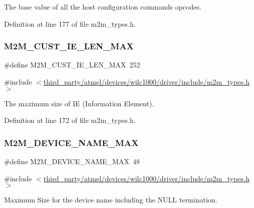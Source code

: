 The base value of all the host configuration commands opcodes. 

Definition at line 177 of file m2m\+\_\+types.\+h.

\mbox{\label{group__WlanDefines_gac03bb9e626f8472cad4f60ad3a0f9b84}} 
\subsubsection{\texorpdfstring{M2\+M\+\_\+\+C\+U\+S\+T\+\_\+\+I\+E\+\_\+\+L\+E\+N\+\_\+\+M\+AX}{M2M\_CUST\_IE\_LEN\_MAX}}
{\footnotesize\ttfamily \#define M2\+M\+\_\+\+C\+U\+S\+T\+\_\+\+I\+E\+\_\+\+L\+E\+N\+\_\+\+M\+AX~252}



{\ttfamily \#include $<$\hyperlink{m2m__types_8h}{third\+\_\+party/atmel/devices/wilc1000/driver/include/m2m\+\_\+types.\+h}$>$}

The maximum size of IE (Information Element). 

Definition at line 172 of file m2m\+\_\+types.\+h.

\mbox{\label{group__WlanDefines_ga13694b7fb6c7afefab58c38a43aa1957}} 
\subsubsection{\texorpdfstring{M2\+M\+\_\+\+D\+E\+V\+I\+C\+E\+\_\+\+N\+A\+M\+E\+\_\+\+M\+AX}{M2M\_DEVICE\_NAME\_MAX}}
{\footnotesize\ttfamily \#define M2\+M\+\_\+\+D\+E\+V\+I\+C\+E\+\_\+\+N\+A\+M\+E\+\_\+\+M\+AX~48}



{\ttfamily \#include $<$\hyperlink{m2m__types_8h}{third\+\_\+party/atmel/devices/wilc1000/driver/include/m2m\+\_\+types.\+h}$>$}

Maximum Size for the device name including the N\+U\+LL termination. 

